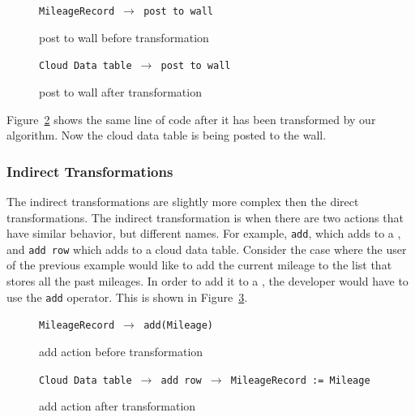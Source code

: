 \documentclass{sigplanconf}
\begin{document}
\begin{figure}[htbp!]
\begin{center}
\texttt{MileageRecord $\rightarrow$ post to wall}

\end{center}
\nocaptionrule
\caption{post to wall before transformation}
\label{fig:numCol_postToWall}
\end{figure}

\begin{figure}[htbp!]
\begin{center}
\texttt{Cloud Data table $\rightarrow$ post to wall}
\nocaptionrule
\caption{post to wall after transformation}
\label{fig:CloudTable_postToWall}
\end{center}
\end{figure}

Figure~\ref{fig:CloudTable_postToWall}  shows the same line of code after it has been transformed by our algorithm.  Now the cloud data table is being posted to the wall.




\subsubsection{Indirect Transformations}
The indirect transformations are slightly more complex then the direct transformations.  The indirect transformation is when there are two actions that have similar behavior, but different names.  For example, \texttt{add}, which adds to a \NC{}, and \texttt{add row} which adds to a cloud data table.  Consider the case where the user of the previous example would like to add the current mileage to the list that stores all the past mileages.  In order to add it to a \NC{}, the developer would have to use the \texttt{add} operator.  This is shown in Figure~\ref{fig:numCol_Add}.

\begin{figure}[htbp!]
\begin{center}
\texttt{MileageRecord $\rightarrow$ add(Mileage)}
\nocaptionrule
\caption{add action before transformation}
\label{fig:numCol_Add}
\end{center}
\end{figure}
\begin{figure}[htbp!]
\begin{center}
\texttt{Cloud Data table $\rightarrow$ add row $\rightarrow$ MileageRecord := Mileage}
\nocaptionrule
\caption{add action after transformation}
\label{fig:CloudTable_Add}
\end{center}
\end{figure}
\end{document}

